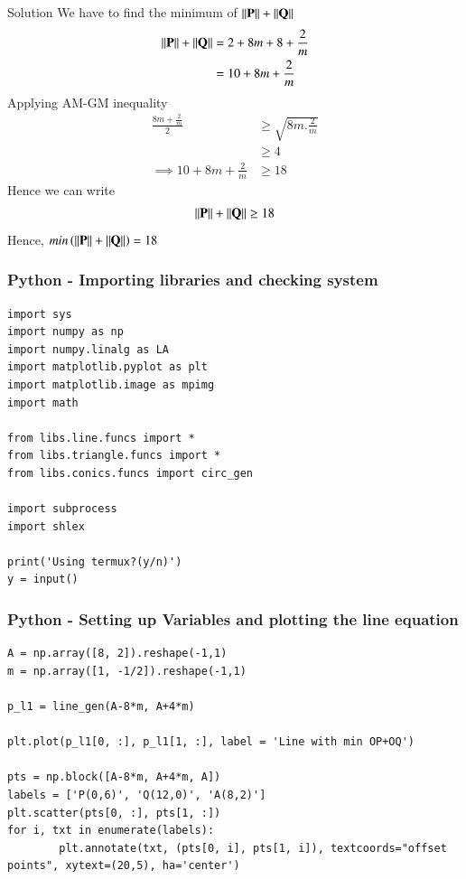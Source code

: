 \documentclass{beamer}
\begin{document}
\begin{frame}{Solution}
We have to find the minimum of $\left\lVert\mathbf{P}\right\rVert + \left\lVert\mathbf{Q}\right\rVert$
\begin{align}
    \left\lVert\mathbf{P}\right\rVert + \left\lVert\mathbf{Q}\right\rVert &= 2 + 8m + 8 + \frac{2}{m} \\
    &= 10 + 8m + \frac{2}{m}
\end{align}
Applying AM-GM inequality
\begin{align}
    \frac{8m + \frac{2}{m}}{2} &\geq \sqrt{8m .\frac{2}{m}} \\
    &\geq 4\\
    \implies 10 + 8m + \frac{2}{m} &\geq 18
\end{align}
Hence we can write
\begin{align}
    \left\lVert\mathbf{P}\right\rVert + \left\lVert\mathbf{Q}\right\rVert \geq 18
\end{align}
Hence, $min\left(\left\lVert\mathbf{P}\right\rVert + \left\lVert\mathbf{Q}\right\rVert\right) = 18$
\end{frame}

\begin{frame}[fragile]
    \frametitle{Python - Importing libraries and checking system}
    \begin{lstlisting}
import sys
import numpy as np
import numpy.linalg as LA
import matplotlib.pyplot as plt
import matplotlib.image as mpimg
import math

from libs.line.funcs import *
from libs.triangle.funcs import *
from libs.conics.funcs import circ_gen

import subprocess
import shlex

print('Using termux?(y/n)')
y = input()
\end{lstlisting}
\end{frame}

\begin{frame}[fragile]
    \frametitle{Python - Setting up Variables and plotting the line equation}
    \begin{lstlisting}
A = np.array([8, 2]).reshape(-1,1)
m = np.array([1, -1/2]).reshape(-1,1)

p_l1 = line_gen(A-8*m, A+4*m)

plt.plot(p_l1[0, :], p_l1[1, :], label = 'Line with min OP+OQ')

pts = np.block([A-8*m, A+4*m, A])
labels = ['P(0,6)', 'Q(12,0)', 'A(8,2)']
plt.scatter(pts[0, :], pts[1, :])
for i, txt in enumerate(labels):
        plt.annotate(txt, (pts[0, i], pts[1, i]), textcoords="offset points", xytext=(20,5), ha='center')
\end{lstlisting}
\end{frame}
\end{document}
